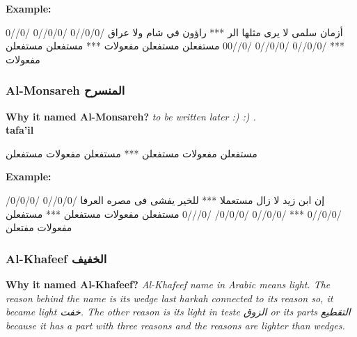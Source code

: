 \textbf{Example:}

\begin{Arabic}
  \begin{traditionalpoem*}


    أزمان سلمى لا يرى مثلها الر *** راؤون في شام ولا عراق
/0/0//0 /0/0//0 /0//0 *** /0/0//0 /0/0//0 /0//00
مستفعلن مستفعلن مفعولات *** مستفعلن مستفعلن مفعولات



	\end{traditionalpoem*}
      \end{Arabic}





\subsubsection{Al-Monsareh \textarabic{المنسرح}}
\textbf{Why it named Al-Monsareh?}
\textit{to be written later :) :) \cite{Alkafi1994}.}\\

\textbf{tafa'il}

\begin{Arabic}
  \begin{traditionalpoem*}

مستفعلن مفعولات مستفعلن *** مستفعلن مفعولات مستفعلن

	\end{traditionalpoem*}
      \end{Arabic}


\textbf{Example:}

\begin{Arabic}
  \begin{traditionalpoem*}

    إن ابن زيد لا زال مستعملا *** للخير يفشى فى مصره العرفا
    /0/0//0 /0/0/0/ /0/0//0 *** /0/0//0 /0/0/0/ /0///0
    مستفعلن مفعولات مستفعلن *** مستفعلن مفعولات مفتعلن



	\end{traditionalpoem*}
      \end{Arabic}


      \newpage


\subsubsection{Al-Khafeef \textarabic{الخفيف}}
\textbf{Why it named Al-Khafeef?}
\textit{Al-Khafeef name in Arabic means light. The reason behind the name is its wedge last harkah connected to its reason so, it became light \textarabic{خفت}. The other reason is its light in teste \textarabic{الزوق} or its parts \textarabic{التقطيع} because it has a part with three reasons and the reasons are lighter than wedges\cite{Alkafi1994}. }\\

